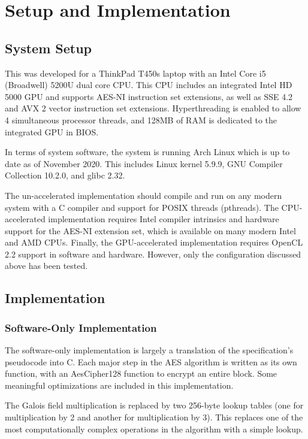 \documentclass[a4paper,10pt,conference]{IEEEtran}
\begin{document}
\section{Setup and Implementation}
 
\subsection{System Setup}

This was developed for a ThinkPad T450s laptop with an Intel Core i5 (Broadwell) 5200U dual core CPU.  This CPU includes an integrated Intel HD 5000 GPU and supports AES-NI instruction set extensions, as well as SSE 4.2 and AVX 2 vector instruction set extensions.  Hyperthreading is enabled to allow 4 simultaneous processor threads, and 128MB of RAM is dedicated to the integrated GPU in BIOS.

In terms of system software, the system is running Arch Linux which is up to date as of November 2020.  This includes Linux kernel 5.9.9, GNU Compiler Collection 10.2.0, and glibc 2.32.

The un-accelerated implementation should compile and run on any modern system with a C compiler and support for POSIX threads (pthreads).  The CPU-accelerated implementation requires Intel compiler intrinsics and hardware support for the AES-NI extension set, which is available on many modern Intel and AMD CPUs.  Finally, the GPU-accelerated implementation requires OpenCL 2.2 support in software and hardware.  However, only the configuration discussed above has been tested.

\subsection{Implementation}

\subsubsection{Software-Only Implementation}

The software-only implementation is largely a translation of the specification's pseudocode into C.  Each major step in the AES algorithm is written as its own function, with an AesCipher128 function to encrypt an entire block.  Some meaningful optimizations are included in this implementation.

The Galois field multiplication is replaced by two 256-byte lookup tables (one for multiplication by 2 and another for multiplication by 3). This replaces one of the most computationally complex operations in the algorithm with a simple lookup.
\end{document}
